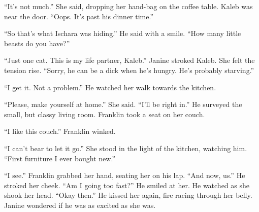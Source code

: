 ``It's not much.'' She said, dropping her hand-bag on the coffee table. Kaleb was near the door. ``Oops. It's past his dinner time.'' \par ``So that's what Ischara was hiding.'' He said with a smile. ``How many little beasts do you have?'' \par ``Just one cat. This is my life partner, Kaleb.'' Janine stroked Kaleb. She felt the tension rise. ``Sorry, he can be a dick when he's hungry. He's probably starving.'' \par ``I get it. Not a problem.'' He watched her walk towards the kitchen. \par ``Please, make yourself at home.'' She said. ``I'll be right in.'' He surveyed the small, but classy living room. Franklin took a seat on her couch. \par ``I like this couch.'' Franklin winked. \par ``I can't bear to let it go.'' She stood in the light of the kitchen, watching him. ``First furniture I ever bought new.'' \par ``I see.'' Franklin grabbed her hand, seating her on his lap. ``And now, us.'' He stroked her cheek. ``Am I going too fast?'' He smiled at her. He watched as she shook her head. ``Okay then.'' He kissed her again, fire racing through her belly. Janine wondered if he was as excited as she was. 
